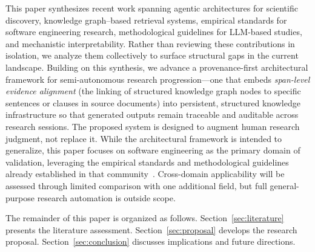 This paper synthesizes recent work spanning agentic architectures for scientific discovery, knowledge graph–based retrieval systems, empirical standards for software engineering research, methodological guidelines for LLM-based studies, and mechanistic interpretability. Rather than reviewing these contributions in isolation, we analyze them collectively to surface structural gaps in the current landscape. Building on this synthesis, we advance a provenance-first architectural framework for semi-autonomous research progression—one that embeds \emph{span-level evidence alignment} (the linking of structured knowledge graph nodes to specific sentences or clauses in source documents) into persistent, structured knowledge infrastructure so that generated outputs remain traceable and auditable across research sessions. The proposed system is designed to augment human research judgment, not replace it. While the architectural framework is intended to generalize, this paper focuses on software engineering as the primary domain of validation, leveraging the empirical standards and methodological guidelines already established in that community~\cite{ralph2021empirical, baltes2025guidelines}. Cross-domain applicability will be assessed through limited comparison with one additional field, but full general-purpose research automation is outside scope.

The remainder of this paper is organized as follows. Section~\ref{sec:literature} presents the literature assessment. Section~\ref{sec:proposal} develops the research proposal. Section~\ref{sec:conclusion} discusses implications and future directions.